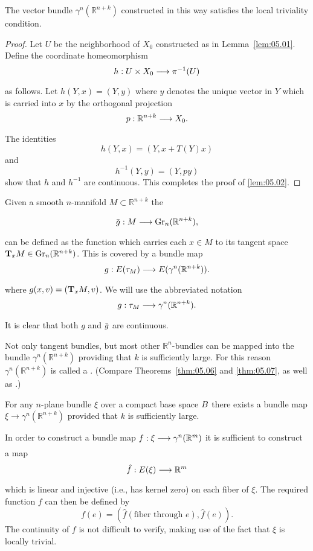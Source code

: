 \documentclass[../main]{subfiles}
\begin{document}
\begin{lemma}\label{lem:05.02}
	The vector bundle $\gamma^{n}(\mathbb{R}^{n+k})$ constructed in this way satisfies the local triviality condition.
\end{lemma}
\begin{proof}
	Let $U$ be the neighborhood of $X_{0}$ constructed as in Lemma~\ref{lem:05.01}. Define the coordinate homeomorphism
	\[h:U\times X_0\varrightarrow{}\pi\inv (U)
	\]
	as follows. Let $h(Y, x)=(Y, y)$ where $y$ denotes the unique vector in $Y$ which is carried into $x$ by the orthogonal projection
	\[p:\mathbb{R}^{n+k} \varrightarrow{}X_{0}. 
	\]
	The identities
	\[
	h(Y, x)=(Y, x+T(Y) x)
	\]
	and
	\[
	h^{-1}(Y, y)=(Y, py)
	\]
show that $h$ and $h^{-1}$ are continuous. This completes the proof of \ref{lem:05.02}.
\end{proof}

Given a smooth $n$-manifold $M \subset \mathbb{R}^{n+k}$ the 

\[\map{\xoverline{g}}{M}{\grassmannian_n (\mathbb{R}^{n+k})},
\]
can be defined as the function which carries each $x \in M$ to its tangent space $\tangentspace{M}{x} \in \grassmannian_n (\mathbb{R}^{n+k})$. This is covered by a bundle map
\[\map{g}{\total(\tangentbundle{M})}{\total(\gamma^{n}(\mathbb{R}^{n+k}))}.
\]
where $g(x, v)=(\tangentspace{M}{x}, v) $. We will use the abbreviated notation
\[\map{g}{\tangentbundle{M}}{\gamma^{n}(\mathbb{R}^{n+k})}.
\]
It is clear that both $g$ and $\xoverline{g}$ are continuous.

Not only tangent bundles, but most other $\mathbb{R}^{n}$-bundles can be mapped into the bundle $\gamma^{n}(\mathbb{R}^{n+k})$ providing that $k$ is sufficiently large. For this reason $\gamma^{n}(\mathbb{R}^{n+k})$ is called a . (Compare Theorems~\ref{thm:05.06} and \ref{thm:05.07}, as well as \cite[$\S$ 19]{steenrodwhitehead1951}.)

\begin{lemma}\label{lem:05.03}
	For any $n$-plane bundle $\xi$ over a compact base space $\B $ there exists a bundle map $\xi \rightarrow \gamma^{n}(\mathbb{R}^{n+k})$ provided that $k$ is sufficiently large.
\end{lemma}

In order to construct a bundle map $\map{f}{\xi}{\gamma^{n}(\mathbb{R}^{m})}$ it is sufficient to construct a map
\[\map{\hat{f}}{\total(\xi)}{\mathbb{R}^{m}}
\]
which is linear and injective (i.e., has kernel zero) on each fiber of $\xi$. The required function $f$ can then be defined by
\[
f(e)=(\hat{f} (\text{fiber through } e), \hat{f}(e)).
\]
The continuity of $f$ is not difficult to verify, making use of the fact that $\xi$ is locally trivial.
\end{document}
